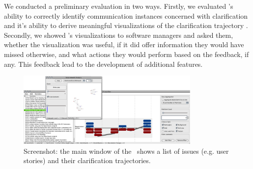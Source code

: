 



We conducted a preliminary evaluation in two ways. Firstly, we evaluated \viss's ability to correctly identify communication instances concerned with clarification and it's ability to derive meaningful visualizations of the clarification trajectory \cite{Knauss2012f}. 
Secondly, we showed  \viss's visualizations to software managers and asked them, whether the visualization was useful, if it did offer information they would have missed otherwise, and what actions they would perform based on the feedback, if any. 
This feedback lead to the development of additional features.

\begin{figure}
\centering
\includegraphics[width=0.8\textwidth]{img/vissuelizer-screenshot}
\caption{Screenshot: the main window of the \viss\ shows a list of issues (e.g. user stories) and their clarification trajectories.}
\label{fig:screenshot}
\end{figure}